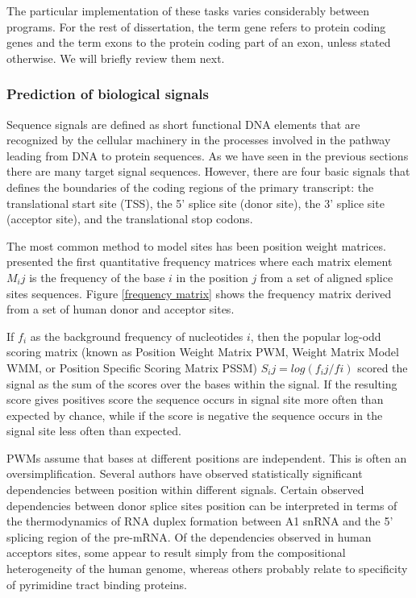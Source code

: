 The particular implementation of these tasks varies considerably
between programs. For the rest of dissertation, the term gene refers to
protein coding genes and the term exons to the protein coding part of
an exon, unless stated otherwise. We will briefly review them next.

\subsubsection{Prediction of biological signals}

Sequence signals are defined as short functional DNA elements that are
recognized by the cellular machinery in the processes involved in the
pathway leading from DNA to protein sequences. As we have seen in the
previous sections there are many target signal sequences. However,
there are four basic signals that defines the boundaries of the coding
regions of the primary transcript: the translational start site (TSS), the
5' splice site (donor site), the 3' splice site (acceptor site), and
the translational stop codons.


The most common method to model sites has been position weight
matrices. \cite{senapathy:1990a} presented the first quantitative
frequency matrices where each matrix element $M_ij$ is the frequency
of the base $i$ in the position $j$ from a set of aligned splice sites
sequences. Figure \ref{frequency matrix} shows the frequency matrix
derived from a set of human donor and acceptor sites.




If $f_i$ as the background frequency of nucleotides $i$, then the
popular log-odd scoring matrix (known as Position Weight Matrix PWM,
Weight Matrix Model WMM, or Position Specific Scoring Matrix PSSM)
$S_ij=log(f_ij/fi)$ scored the signal as the sum of the scores over
the bases within the signal. If the resulting score gives positives
score the sequence occurs in signal site more often than expected by
chance, while if the score is negative the sequence occurs in the
signal site less often than expected.

PWMs assume that bases at different positions are independent. This is
often an oversimplification.  Several authors have observed
statistically significant dependencies between position within
different signals. Certain observed dependencies between donor splice
sites position can be interpreted in terms of the thermodynamics of
RNA duplex formation between A1 snRNA and the 5' splicing region of
the pre-mRNA. Of the dependencies observed in human acceptors sites,
some appear to result simply from the compositional heterogeneity of
the human genome, whereas others probably relate to specificity of
pyrimidine tract binding proteins.

